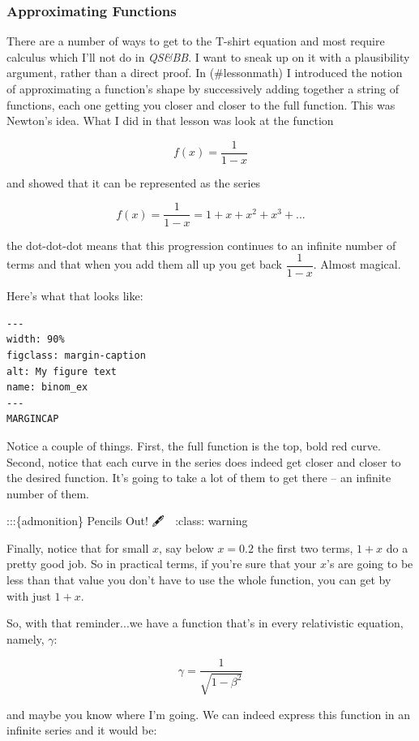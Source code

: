 \documentclass[
]{article}
\begin{document}
\hypertarget{approximating-functions}{%
\subsubsection{Approximating Functions}\label{approximating-functions}}

There are a number of ways to get to the T-shirt equation and most
require calculus which I'll not do in \emph{QS\&BB}. I want to sneak up
on it with a plausibility argument, rather than a direct proof. In
\textbackslash@ref(\#lessonmath) I introduced the notion of
approximating a function's shape by successively adding together a
string of functions, each one getting you closer and closer to the full
function. This was Newton's idea. What I did in that lesson was look at
the function

\[f(x) = \frac{1}{1-x} \nonumber\]

and showed that it can be represented as the series

\[f(x) = \frac{1}{1-x} = 1+x+x^2 + x^3 +... \nonumber\]

the dot-dot-dot means that this progression continues to an infinite
number of terms and that when you add them all up you get back
\(\dfrac{1}{1-x}\). Almost magical.

Here's what that looks like:

\begin{verbatim}
---
width: 90%
figclass: margin-caption
alt: My figure text
name: binom_ex
---
MARGINCAP
\end{verbatim}

Notice a couple of things. First, the full function is the top, bold red
curve. Second, notice that each curve in the series does indeed get
closer and closer to the desired function. It's going to take a lot of
them to get there -- an infinite number of them.

:::\{admonition\} Pencils Out! 🖋 📓 :class: warning

Finally, notice that for small \(x\), say below \(x=0.2\) the first two
terms, \(1+x\) do a pretty good job. So in practical terms, if you're
sure that your \(x\)'s are going to be less than that value you don't
have to use the whole function, you can get by with just \(1+x\).

So, with that reminder...we have a function that's in every relativistic
equation, namely, \(\gamma\):

\[\gamma = \frac{1}{\sqrt{1-\beta^2}} \nonumber\]

and maybe you know where I'm going. We can indeed express this function
in an infinite series and it would be:
\end{document}

